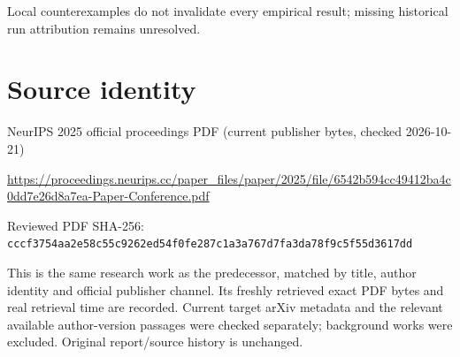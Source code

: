 \documentclass[11pt]{article}
\begin{document}
Local counterexamples do not invalidate every empirical result; missing historical run attribution remains unresolved.\par

\section*{Source identity}

NeurIPS 2025 official proceedings PDF (current publisher bytes, checked 2026-10-21)

\url{https://proceedings.neurips.cc/paper_files/paper/2025/file/6542b594cc49412ba4c0dd7e26d8a7ea-Paper-Conference.pdf}

Reviewed PDF SHA-256: \nolinkurl{cccf3754aa2e58c55c9262ed54f0fe287c1a3a767d7fa3da78f9c5f55d3617dd}

This is the same research work as the predecessor, matched by title, author identity and official publisher channel. Its freshly retrieved exact PDF bytes and real retrieval time are recorded. Current target arXiv metadata and the relevant available author-version passages were checked separately; background works were excluded. Original report/source history is unchanged.
\end{document}
